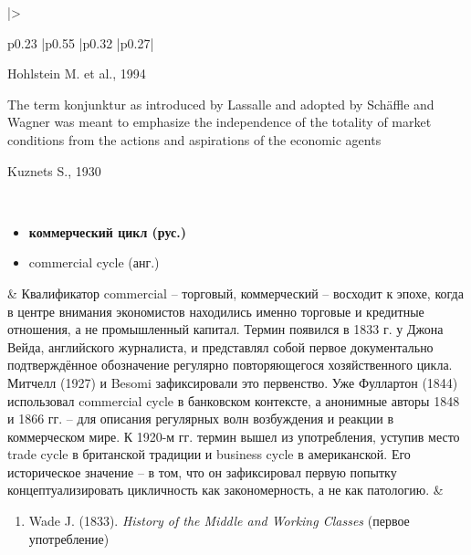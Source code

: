 \begin{longtable}{
    |>{\raggedright\arraybackslash}p{0.23\textwidth}
    |p{0.55\textwidth}
    |p{0.32\textwidth}
    |p{0.27\textwidth}|
    }
\begin{flushright}
    Hohlstein M. et al., 1994\cite{Hohlstein-1994}
\end{flushright}
\vspace{7pt}
\textquotedbl{}The term konjunktur as introduced by Lassalle and adopted by Schäffle and Wagner was meant to emphasize the independence of the totality of market conditions from the actions and aspirations of the economic agents\textquotedbl{}
\begin{flushright}
    Kuznets S., 1930\cite{Kuznets-1930}
\end{flushright}
\\ \hline

\begin{minipage}[t]{\linewidth}
    \raggedright
    \begin{itemize}
        \item \textbf{коммерческий цикл (рус.)}
        \item commercial cycle (анг.)
    \end{itemize}
\end{minipage}
&
Квалификатор \textquotedbl{}commercial\textquotedbl{} – \textquotedbl{}торговый\textquotedbl{}, \textquotedbl{}коммерческий\textquotedbl{} – восходит к эпохе, когда в центре внимания экономистов находились именно торговые и кредитные отношения, а не промышленный капитал. Термин появился в 1833 г. у Джона Вейда, английского журналиста, и представлял собой первое документально подтверждённое обозначение регулярно повторяющегося хозяйственного цикла. Митчелл (1927) и Besomi зафиксировали это первенство. Уже Фуллартон (1844) использовал \textquotedbl{}commercial cycle\textquotedbl{} в банковском контексте, а анонимные авторы 1848 и 1866 гг. – для описания регулярных волн \textquotedbl{}возбуждения\textquotedbl{} и \textquotedbl{}реакции\textquotedbl{} в коммерческом мире. К 1920-м гг. термин вышел из употребления, уступив место \textquotedbl{}trade cycle\textquotedbl{} в британской традиции и \textquotedbl{}business cycle\textquotedbl{} в американской. Его историческое значение – в том, что он зафиксировал первую попытку концептуализировать цикличность как закономерность, а не как патологию.
&
\begin{minipage}[t]{\linewidth}
    \vspace{-7pt}
    \RaggedRight
    \begin{enumerate}
        \item Wade J. (1833). \textit{History of the Middle and Working Classes}\cite{Wade-1833} (первое употребление)

\end{enumerate}
\end{minipage}
\end{longtable}
